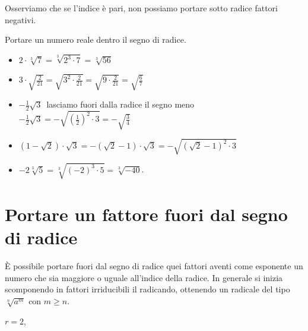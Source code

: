 Osserviamo che se l'indice è pari, non possiamo portare sotto radice 
fattori negativi.

 \begin{esempio}
 Portare un numero reale dentro il segno di radice.
 \begin{itemize}
 \item \(2\cdot \sqrt[3]7=\sqrt[3]{2^3\cdot 7}=\sqrt[3]{56}\)
 \item \(3\cdot \sqrt{\frac 2{21}}= \sqrt{3^2 \cdot \frac 2{21}}=
        \sqrt{9 \cdot \frac 2{21}}= \sqrt{\frac 6 7}\)
 \item \(-\frac 1 2\sqrt{3}\)\, lasciamo fuori dalla radice il segno meno 
       \(-\frac 1 2\sqrt{3}=-\sqrt{\left(\frac 1 2\right)^2\cdot 3}=
        -\sqrt{\frac 3 4}\)
 \item \((1-\sqrt{2})\cdot \sqrt{3}=-(\sqrt{2}-1)\cdot \sqrt{3}=
        -\sqrt{(\sqrt{2}-1)^2\cdot 3}\)
 \item \(-2\sqrt[3]5=\sqrt[3]{(-2)^3\cdot 5}=\sqrt[3]{-40}\).
 \end{itemize}
 \end{esempio}
 
\section{Portare un fattore fuori dal segno di radice}
\label{sec:radicali_portare_fuori}

È possibile portare fuori dal segno di radice quei fattori aventi come 
esponente un numero che sia maggiore o uguale all'indice della radice. 
In generale si inizia scomponendo in fattori irriducibili il radicando, 
ottenendo un radicale del tipo \(\sqrt[n]{a^m}\) con \(m\ge n\).

% 
% 
\(r=2\), 

